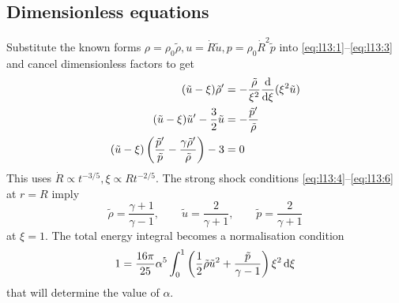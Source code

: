 \documentclass{jknotes}
\begin{document}
\subsection{Dimensionless equations}
Substitute the known forms $\rho = \rho_0 \tilde{\rho}, u = \dot{R} \tilde{u},
p = \rho_0 \dot{R}^2 \tilde{p}$ into \eqref{eq:l13:1}--\eqref{eq:l13:3} and
cancel dimensionless factors to get
\begin{align}
	(\tilde{u}-\xi) \tilde{\rho}' &= - \frac{\tilde{\rho}}{\xi^2}
	\frac{\diffd}{\diffd \xi}(\xi^2 \tilde{u}) \\
	(\tilde{u}-\xi)\tilde{u}' - \frac{3}{2}\tilde{u} &=
	-\frac{\tilde{p}'}{\tilde{\rho}} \\
	(\tilde{u}-\xi)\left(\frac{\tilde{p}'}{\tilde{p}} - \frac{\gamma
	\tilde{\rho}'}{\tilde{\rho}}\right) -3 &= 0
\end{align}
This uses $\dot{R} \propto t^{-3/5}, \xi \propto R t^{-2/5}$. The strong shock
conditions \eqref{eq:l13:4}--\eqref{eq:l13:6} at $r=R$ imply
\begin{equation}
	\tilde{\rho} = \frac{\gamma+1}{\gamma-1}, \hspace{2em} \tilde{u} =
	\frac{2}{\gamma +1}, \hspace{2em} \tilde{p} = \frac{2}{\gamma +1}
\end{equation}
at $\xi = 1$. The total energy integral becomes a normalisation condition
\begin{equation}
	1 = \frac{16 \pi}{25} \alpha^5 \int_0^1 \left(
	\frac{1}{2}\tilde{\rho}\tilde{u}^2 + \frac{\tilde{p}}{\gamma -1}\right)
	\xi^2\, \diffd \xi
\end{equation}
that will determine the value of $\alpha$.
\end{document}

